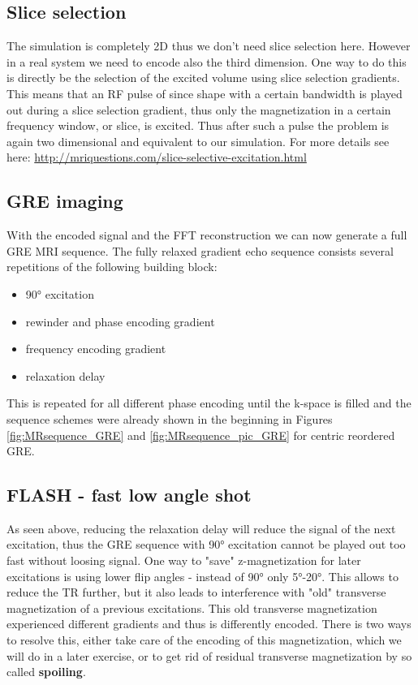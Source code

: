 \documentclass[a4paper,12pt]{extarticle}
\begin{document}
\subsection{Slice selection}
The simulation is completely 2D thus we don't need slice selection here. However in a real system we need to encode also the third dimension. One way to do this is directly be the selection of the excited volume using slice selection gradients. This means that an RF pulse of since shape with a certain bandwidth is played out during a slice selection gradient, thus only the magnetization in a certain frequency window, or slice, is excited. Thus after such a pulse the problem is again two dimensional and equivalent to our simulation. For more details see here: \href{http://mriquestions.com/slice-selective-excitation.html}{http://mriquestions.com/slice-selective-excitation.html}

\subsection{GRE imaging}
With the encoded signal and the FFT reconstruction we can now generate a full GRE MRI sequence. The fully relaxed gradient echo sequence consists several repetitions of the following building block: 
\begin{itemize}
\item 90° excitation
\item rewinder and phase encoding gradient 
\end{itemize}
\begin{itemize}
\item frequency encoding gradient
\item relaxation delay
\end{itemize}
This is repeated for all different phase encoding until the k-space is filled and the sequence schemes were already shown in the beginning in Figures \ref{fig:MRsequence_GRE} and \ref{fig:MRsequence_pic_GRE} for centric reordered GRE.

\subsection{FLASH - fast low angle shot}
As seen above, reducing the relaxation delay will reduce the signal of the next excitation, thus the GRE sequence with 90° excitation cannot be played out too fast without loosing signal. One way to "save" z-magnetization for later excitations is using lower flip angles - instead of 90° only 5°-20°. This allows to reduce the TR further, but it also leads to interference with "old" transverse magnetization of a previous excitations. This old transverse magnetization experienced different gradients and thus is differently encoded. There is two ways to resolve this, either take care of the encoding of this magnetization, which we will do in a later exercise, or to get rid of residual transverse magnetization by so called \textbf{spoiling}.
\end{document}
